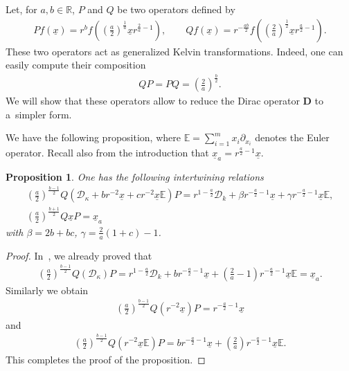 \documentclass[11pt]{article}
\newtheorem{proposition}{Proposition}
\numberwithin{equation}{section}
\numberwithin{theorem}{section}
\numberwithin{proposition}{section}
\numberwithin{lemma}{section}
\numberwithin{corollary}{section}
\numberwithin{definition}{section}
\numberwithin{example}{section}
\numberwithin{remark}{section}
\numberwithin{note}{section}
\theoremstyle{remark}
\newcommand{\mR}{\mathbb{R}}
\newcommand{\mE}{\mathbb{E}}
\newcommand{\cD}{\mathcal{D}}
\newcommand{\dD}{\textbf{D}}
\newcommand{\ux}{\underline{x}}
\def\b{{\beta}}
\def\g{{\gamma}}
\def\k{{\kappa}}
\begin{document}
Let, for $a,b\in\mR$, $P$ and $Q$ be two operators def\/ined by
\begin{gather*}
P f(\ux)=r^{b}f\left(\left(\frac{a}{2}\right)^{\frac{1}{a}}\ux r^{\frac{2}{a}-1}\right),\qquad
Q f(\ux)=r^{-\frac{ab}{2}}f\left(\left(\frac{2}{a}\right)^{\frac{1}{2}}\ux r^{\frac{a}{2}-1}\right).
\end{gather*}
These two operators act as generalized Kelvin transformations.
Indeed, one can easily compute their composition
\begin{gather*}
Q P=P Q=\left(\frac{2}{a}\right)^{\frac{b}{2}}.
\end{gather*}
We will show that these operators allow to reduce the Dirac operator $\dD$ to a~simpler form.

We have the following proposition, where $\mE=\sum\limits_{i=1}^{m}x_{i}\partial_{x_{i}}$ denotes the
Euler operator.
Recall also from the introduction that $\ux_{a}=r^{\frac{a}{2}-1}\ux$.

\begin{proposition}
One has the following intertwining relations
\begin{gather*}
\left(\frac{a}{2} \right)^{\frac{b-1}{2}} Q \left( \cD_{\k} + b r^{-2} \ux + c r^{-2}\ux \mE
\right) P = r^{1- \frac{a}{2}}\cD_{k} + \b r^{-\frac{a}{2}-1} \ux + \g r^{-\frac{a}{2}-1}\ux \mE,\\
\left(\frac{a}{2} \right)^{\frac{b+1}{2}} Q \ux P = \ux_{a}
\end{gather*}
with
$
\b= 2b+ bc$, $
\g= \frac{2}{a} (1+c) -1$.
\end{proposition}

\begin{proof}
In~\cite[Proposition 3]{H12}, we already proved that
\begin{gather*}
\left(\frac{a}{2}\right)^{\frac{b-1}{2}}Q\left(\cD_{\k}\right)P=r^{1-\frac{a}{2}}\cD_{k}+
b r^{-\frac{a}{2}-1}\ux+\left(\frac{2}{a}-1\right)r^{-\frac{a}{2}-1}\ux\mE=\ux_{a}.
\end{gather*}
Similarly we obtain
\begin{gather*}
\left(\frac{a}{2}\right)^{\frac{b-1}{2}}Q\left(r^{-2}\ux\right)P=r^{-\frac{a}{2}-1}\ux
\end{gather*}
and
\begin{gather*}
\left(\frac{a}{2}\right)^{\frac{b-1}{2}}Q\left(r^{-2}\ux\mE\right)P=b r^{-\frac{a}{2}-1}
\ux+\left(\frac{2}{a}\right)r^{-\frac{a}{2}-1}\ux\mE.
\end{gather*}
This completes the proof of the proposition.
\end{proof}
\end{document}
